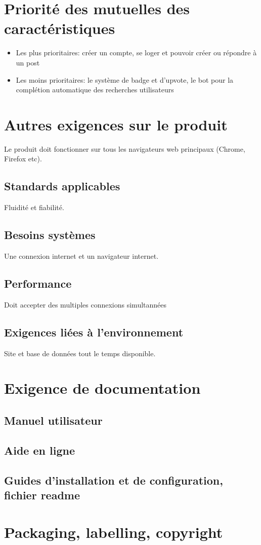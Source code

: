 \section{Priorité des mutuelles des caractéristiques}
\begin{itemize}
		\item Les plus prioritaires: créer un compte, se loger et pouvoir créer ou répondre à un post
		\item Les moins prioritaires: le système de badge et d'upvote, le bot pour la complétion automatique des recherches utilisateurs
\end{itemize}



\section{Autres exigences sur le produit}

Le produit doit fonctionner sur tous les navigateurs web principaux (Chrome, Firefox etc).

\subsection{Standards applicables}
Fluidité et fiabilité.

\subsection{Besoins systèmes}

Une connexion internet et un navigateur internet.


\subsection{Performance}

Doit accepter des multiples connexions simultannées

\subsection{Exigences liées à l’environnement}

Site et base de données tout le temps disponible.

\section{Exigence de documentation}
\subsection{Manuel utilisateur}

\subsection{Aide en ligne}

\subsection{Guides d’installation et de configuration, fichier readme}

\section{Packaging, labelling, copyright}